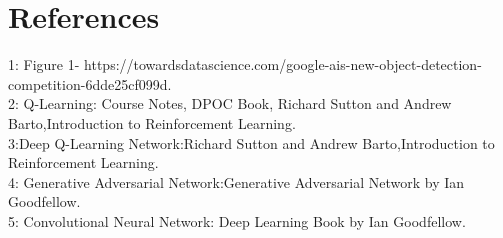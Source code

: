 \documentclass{article}
\begin{document}
\section{References}
1: Figure 1- https://towardsdatascience.com/google-ais-new-object-detection-competition-6dde25cf099d.\\
2: Q-Learning: Course Notes, DPOC Book, Richard Sutton and Andrew Barto,Introduction to Reinforcement Learning.\\
3:Deep Q-Learning Network:Richard Sutton and Andrew Barto,Introduction to Reinforcement Learning.\\
4: Generative Adversarial Network:Generative Adversarial Network by Ian Goodfellow.\\
5: Convolutional Neural Network: Deep Learning Book by Ian Goodfellow.\\



\end{document}
